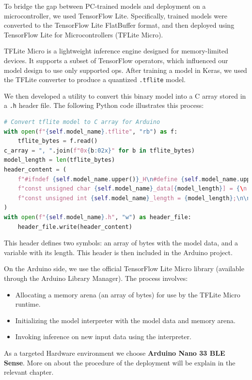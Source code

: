 To bridge the gap between PC-trained models and deployment on a microcontroller, we used TensorFlow Lite. Specifically, trained models were converted to the TensorFlow Lite FlatBuffer format, and then deployed using TensorFlow Lite for Microcontrollers (TFLite Micro).

TFLite Micro is a lightweight inference engine designed for memory-limited devices. It supports a subset of TensorFlow operators, which influenced our model design to use only supported ops. After training a model in Keras, we used the TFLite converter to produce a quantized \texttt{.tflite} model.

We then developed a utility to convert this binary model into a C array stored in a \texttt{.h} header file. The following Python code illustrates this process:

\begin{lstlisting}[language=Python, caption={Convert a TFLite model to a C header array for Arduino deployment}, label=lst:tflite_to_c_array]
# Convert tflite model to C array for Arduino
with open(f"{self.model_name}.tflite", "rb") as f:
    tflite_bytes = f.read()
c_array = ", ".join(f"0x{b:02x}" for b in tflite_bytes)
model_length = len(tflite_bytes)
header_content = (
    f"#ifndef {self.model_name.upper()}_H\n#define {self.model_name.upper()}_H\n\n"
    f"const unsigned char {self.model_name}_data[{model_length}] = {\n    {c_array}\n}};\n"
    f"const unsigned int {self.model_name}_length = {model_length};\n\n#endif"
)
with open(f"{self.model_name}.h", "w") as header_file:
    header_file.write(header_content)
\end{lstlisting}

This header defines two symbols: an array of bytes with the model data, and a variable with its length. This header is then included in the Arduino project.

On the Arduino side, we use the official TensorFlow Lite Micro library (available through the Arduino Library Manager). The process involves:

\begin{itemize}
    \item Allocating a memory arena (an array of bytes) for use by the TFLite Micro runtime.
    \item Initializing the model interpreter with the model data and memory arena.
    \item Invoking inference on new input data using the interpreter.
\end{itemize}


As a targeted Hardware environment we choose \textbf{Arduino Nano 33 BLE Sense}. More on about the procedure of the deployment will be explain in the relevant chapter.

